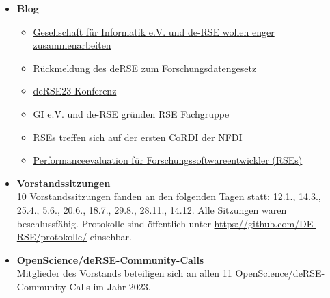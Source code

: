 \begin{itemize}
 \item \textbf{Blog}
 \begin{itemize}
  \item \href{https://de-rse.org/blog/2023/02/03/Gesellschaft-fuer-Informatik-und-de-RSE-wollen-enger-zusammenarbeiten.html}{Gesellschaft für Informatik e.V. und de-RSE wollen enger zusammenarbeiten}
  \item \href{https://de-rse.org/blog/2023/04/05/R%C3%BCckmeldung-des-deRSE-zum-Forschungsdatengesetz.html}{Rückmeldung des deRSE zum Forschungsdatengesetz}
  \item \href{https://de-rse.org/blog/2023/04/25/deRSE23-de.html}{deRSE23 Konferenz}
  \item \href{https://de-rse.org/blog/2023/07/18/RSE-Fachgruppe-de.html}{GI e.V. und de-RSE gründen RSE Fachgruppe}
  \item \href{https://de-rse.org/blog/2023/10/05/rses-treffen-sich-auf-der-ersten-cordi-der-nfdi.html}{RSEs treffen sich auf der ersten CoRDI der NFDI}
  \item \href{https://de-rse.org/blog/2023/12/06/Performanceevaluation-fuer-Forschungssoftwareentwickler-de.html}{Performanceevaluation für Forschungssoftwareentwickler (RSEs)}
 \end{itemize}
 \item \textbf{Vorstandssitzungen}\\
  10 Vorstandssitzungen fanden an den folgenden Tagen statt: 12.1., 14.3., 25.4., 5.6., 20.6., 18.7., 29.8., 28.11., 14.12.
  Alle Sitzungen waren beschlussfähig.
  Protokolle sind öffentlich unter \href{https://github.com/DE-RSE/protokolle/}{https://github.com/DE-RSE/protokolle/} einsehbar.
 \item \textbf{OpenScience/deRSE-Community-Calls}\\
 Mitglieder des Vorstands beteiligen sich an allen 11 OpenScience/deRSE-Community-Calls im Jahr 2023.
\end{itemize}




